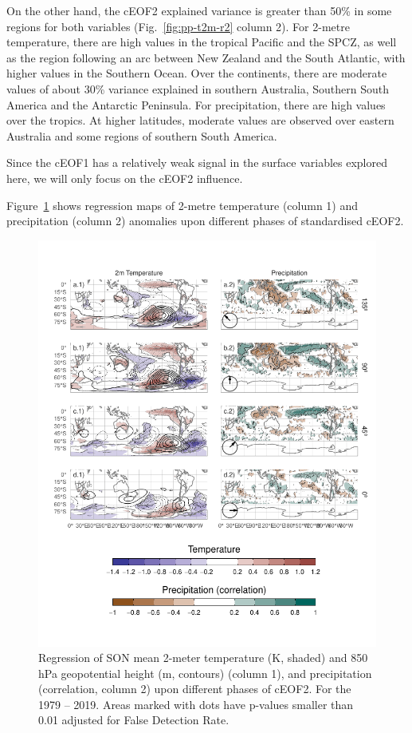 \documentclass[pdflatex,sn-basic]{sn-jnl}
\theoremstyle{thmstyleone}%
\theoremstyle{thmstyletwo}%
\theoremstyle{thmstylethree}%
\begin{document}
On the other hand, the cEOF2 explained variance is greater than 50\% in some regions for both variables (Fig.~\ref{fig:pp-t2m-r2} column 2).
For 2-metre temperature, there are high values in the tropical Pacific and the SPCZ, as well as the region following an arc between New Zealand and the South Atlantic, with higher values in the Southern Ocean.
Over the continents, there are moderate values of about 30\% variance explained in southern Australia, Southern South America and the Antarctic Peninsula.
For precipitation, there are high values over the tropics. At higher latitudes, moderate values are observed over eastern Australia and some regions of southern South America.

Since the cEOF1 has a relatively weak signal in the surface variables explored here, we will only focus on the cEOF2 influence.

Figure~\ref{fig:pp-temp-2} shows regression maps of 2-metre temperature (column 1) and precipitation (column 2) anomalies upon different phases of standardised cEOF2.



\begin{figure}
\centering
\includegraphics{../figures/pp-temp-2-1.pdf}
\caption{\label{fig:pp-temp-2}Regression of SON mean 2-meter temperature (K, shaded) and 850 hPa geopotential height (m, contours) (column 1), and precipitation (correlation, column 2) upon different phases of cEOF2. For the 1979 -- 2019. Areas marked with dots have p-values smaller than 0.01 adjusted for False Detection Rate.}
\end{figure}
\end{document}
